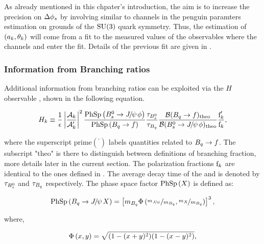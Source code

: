 As already mentioned in this chpater's introduction, the aim is to increase the precision on $\Delta{\ensuremath{\phi_{s}}}$
by involving similar to \BsJpsiPhi channels in the penguin paramters estimation on grounds of the $\mathrm{SU}(3)$ quark symmetry.
Thus, the estimation of $(a_k,\theta_k)$ will come from a \chisq fit to the measured values of the observables
 where the channels \BsJpsiKst and \BdJpsiRho enter the fit.
Details of the previous fit are given in .

\subsubsection{Information from Branching ratios}
Additional information from branching ratios can be exploited via the $H$ observable \cite{Fleischer:1999zi}, shown in
the following equation.

\begin{equation}
\centering
  \Hobs{k} \equiv   \frac{1}{\epsilon}
            \modulo{\frac{\formFctr{k}}{\formFctr{k}'}}^2
                    \frac{\PhSp{\BsJpsiPhi}} {\PhSp{\Bq\to f}}
                    \frac{\tau_{\Bs}}{\tau_{\Bq}}
                    \frac{\BRof{\Bq\to f}_{\rm theo}}{\BRof{\BsJpsiPhi}_{\rm theo}}
                    \frac{\fP{k}'}{{\fP{k}}},
\label{hobs_def}
\end{equation}

\noindent where the superscript prime$({}^\prime)$ labels quantities related to $B_q\rightarrow f$. The subscript "theo" is there
to distinguish between definitions of branching fraction, more details later in the current section.
The polarization fractions $\text{f}_{k}$ are identical to the ones defined in .
The average decay time of the \Bs and \Bq is denoted by $\tau_{B^0_s}$ and $\tau_{B_q}$ respectively.
The phase space factor ${\rm PhSp}\left( X \right)$ is defined as:

\begin{equation}
\centering
   \PhSp{\BJpsiX}  = \brackets{ \mass{\Bq} \PhSpPhi{ \nicefrac{\mass{\jpsi}}{\mass{\Bq}}, \nicefrac{\mass{X}}{\mass{\Bq}}  } }^3,
\label{phase_space_eq_def}
\end{equation}

\noindent where,

\begin{equation}
\centering
   \PhSpPhi{x,y} = \sqrt{ (1-(x+y)^2)(1-(x-y)^2) },
\label{phase_space_phi_eq_def}
\end{equation}

